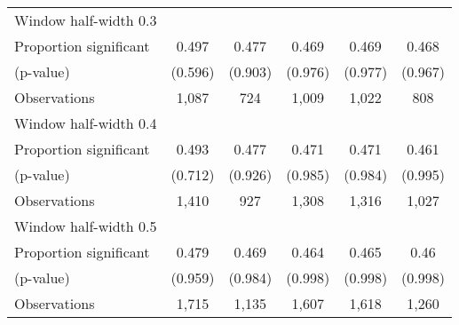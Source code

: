 \begin{tabular}{l*{5}{c}}
\hline
Window half-width 0.3\\

Proportion significant& 0.497 &  0.477 &  0.469 &  0.469 &  0.468\\

(p-value) & (0.596) &  (0.903) &  (0.976) &  (0.977) &  (0.967)\\

Observations& 1,087 &  724 &  1,009 &  1,022 &  808\\

\hline
Window half-width 0.4\\

Proportion significant& 0.493 &  0.477 &  0.471 &  0.471 &  0.461\\

(p-value) & (0.712) &  (0.926) &  (0.985) &  (0.984) &  (0.995)\\

Observations& 1,410 &  927 &  1,308 &  1,316 &  1,027\\

\hline
Window half-width 0.5\\

Proportion significant& 0.479 &  0.469 &  0.464 &  0.465 &  0.46\\

(p-value) & (0.959) &  (0.984) &  (0.998) &  (0.998) &  (0.998)\\

Observations& 1,715 &  1,135 &  1,607 &  1,618 &  1,260\\

\hline\hline
\end{tabular}

